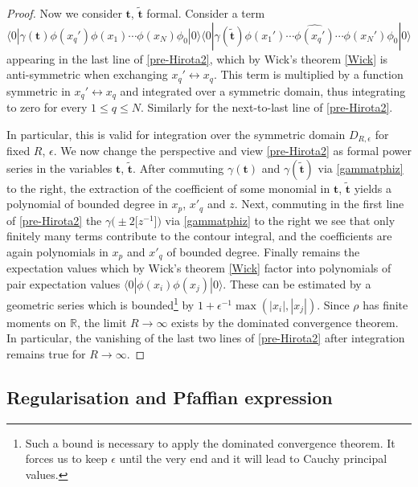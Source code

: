 \documentclass[pdftex]{sigma}
\numberwithin{equation}{section}
\begin{document}
\begin{proof}
Now we consider $\mathbf{t}$, $\tilde{\mathbf{t}}$ formal. Consider a term
\[
\langle 0|\gamma(\mathbf{t}) \phi(x_q')\phi(x_1)\cdots
\phi(x_N) \phi_0|0\rangle
\langle 0|\gamma(\tilde{\mathbf{t}}) \phi(x_1')\cdots \widehat{\phi(x_q')} \cdots
\phi(x_N')
\phi_0|0\rangle
\]
appearing in the last line of
\eqref{pre-Hirota2}, which by Wick's theorem \eqref{Wick}
is anti-symmetric when exchanging
$x_q'\leftrightarrow x_q$. This term is
multiplied by a function symmetric in
$x_q'\leftrightarrow x_q$ and integrated over a
symmetric domain, thus integrating to zero for every $1\leq q\leq N$.
Similarly for the next-to-last line of \eqref{pre-Hirota2}.

In particular, this is valid for integration over the symmetric domain
$D_{R,\epsilon}$ for fixed $R$, $\epsilon$. We now change the perspective
and view \eqref{pre-Hirota2} as formal power series in the variables
$\mathbf{t}$, $\tilde{\mathbf{t}}$. After commuting $\gamma(\mathbf{t})$
and $\gamma(\tilde{\mathbf{t}})$ via \eqref{gammatphiz} to the right,
the extraction of the coefficient of some monomial in
$\mathbf{t}$, $\tilde{\mathbf{t}}$ yields a polynomial of bounded degree
in $x_p$, $x'_q$ and $z$. Next, commuting in the first line of
\eqref{pre-Hirota2} the $\gamma\bigl(\pm 2\bigl[z^{-1}\bigr]\bigr)$ via \eqref{gammatphiz}
to the right we see that only finitely many terms contribute to the
contour integral, and the coefficients are again polynomials in $x_p$
and $x'_q$ of bounded degree. Finally remains the expectation values
which by Wick's theorem \eqref{Wick} factor into polynomials of pair
expectation values $\langle 0|\phi(x_i)\phi(x_j)|0\rangle$. These can
be estimated by a geometric series which is bounded\footnote{Such a
 bound is necessary to apply the dominated convergence theorem. It
 forces us to keep $\epsilon$ until the very end and it will lead to
 Cauchy principal values.} by $1+\epsilon^{-1}\max(|x_i|,|x_j|)$.
Since $\rho$ has finite moments on $\mathbb{R}$, the limit
$R\to \infty$ exists by the dominated convergence theorem. In
particular, the vanishing of the last two lines of \eqref{pre-Hirota2}
after integration remains true for $R\to \infty$.
\end{proof}

\subsection{Regularisation and Pfaffian expression}
\end{document}
